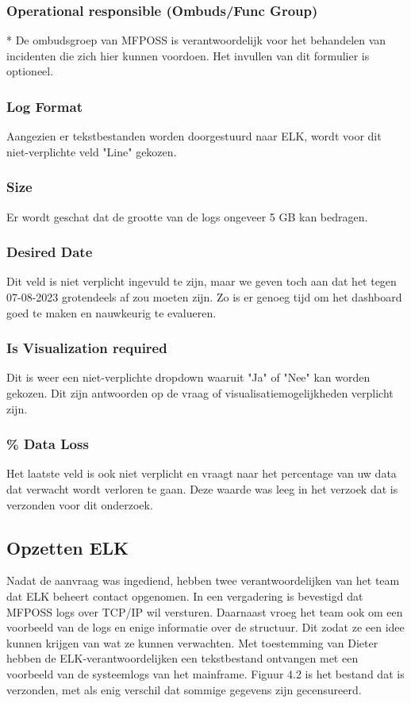 \subsubsection{Operational responsible (Ombuds/Func Group)}*
De ombudsgroep van MFPOSS is verantwoordelijk voor het behandelen van incidenten die zich hier kunnen voordoen. Het invullen van dit formulier is optioneel.

\subsubsection{Log Format}
Aangezien er tekstbestanden worden doorgestuurd naar ELK, wordt voor dit niet-verplichte veld "Line" gekozen.

\subsubsection{Size}
Er wordt geschat dat de grootte van de logs ongeveer 5 GB kan bedragen.

\subsubsection{Desired Date}
Dit veld is niet verplicht ingevuld te zijn, maar we geven toch aan dat het tegen 07-08-2023 grotendeels af zou moeten zijn. Zo is er genoeg tijd om het dashboard goed te maken en nauwkeurig te evalueren.

\subsubsection{Is Visualization required}
Dit is weer een niet-verplichte dropdown waaruit "Ja" of "Nee" kan worden gekozen. Dit zijn antwoorden op de vraag of visualisatiemogelijkheden verplicht zijn.

\subsubsection{\% Data Loss}
Het laatste veld is ook niet verplicht en vraagt naar het percentage van uw data dat verwacht wordt verloren te gaan. Deze waarde was leeg in het verzoek dat is verzonden voor dit onderzoek.

\subsection{Opzetten ELK}

Nadat de aanvraag was ingediend, hebben twee verantwoordelijken van het team dat ELK beheert contact opgenomen. In een vergadering is bevestigd dat MFPOSS logs over TCP/IP wil versturen. Daarnaast vroeg het team ook om een voorbeeld van de logs en enige informatie over de structuur. Dit zodat ze een idee kunnen krijgen van wat ze kunnen verwachten. Met toestemming van Dieter hebben de ELK-verantwoordelijken een tekstbestand ontvangen met een voorbeeld van de systeemlogs van het mainframe. Figuur 4.2 is het bestand dat is verzonden, met als enig verschil dat sommige gegevens zijn gecensureerd.

